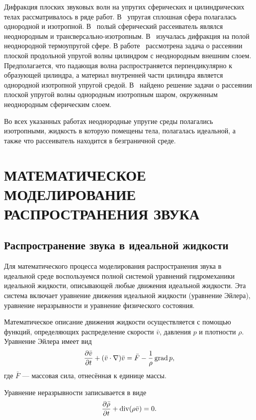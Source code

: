 Дифракция плоских звуковых волн на упругих сферических и цилиндрических телах рассматривалось в ряде работ. 
В~\cite{Faran} упругая сплошная сфера полагалась однородной и изотропной.
В~\cite{transversely isotropic spherical layer} полый сферический рассеиватель являлся неоднородным и трансверсально-изотропным. 
В~\cite{inhomogeneous thermo elastic spherical layer} изучалась дифракция на полой неоднородной термоупругой сфере.
В работе~\cite{plane elastic wave inhomogeneous cylinder} рассмотрена задача о рассеянии плоской продольной упругой волны цилиндром с неоднородным внешним слоем. Предполагается, что падающая волна распространяется перпендикулярно к образующей цилиндра, а материал внутренней части цилиндра является однородной изотропной упругой средой.
В~\cite{plane elastic wave inhomogeneous ball} найдено решение задачи о рассеянии плоской упругой волны однородным изотропным шаром, окруженным неоднородным сферическим слоем.


Во всех указанных работах неоднородные упругие среды полагались изотропными, жидкость в которую помещены тела, полагалась идеальной, а также что рассеиватель находится в безграничной среде.

\newpage
\section{МАТЕМАТИЧЕСКОЕ МОДЕЛИРОВАНИЕ РАСПРОСТРАНЕНИЯ ЗВУКА}
\subsection{Распространение звука в идеальной жидкости}

Для математического процесса моделирования распространения звука в идеальной среде воспользуемся полной системой уравнений гидромеханики идеальной жидкости, описывающей любые движения идеальной жидкости. Эта система включает уравнение движения идеальной жидкости (уравнение Эйлера), уравнение неразрывности и уравнение физического состояния.

Математическое описание движения жидкости осуществляется с помощью функций, определяющих распределение скорости $\bar{v}$, давления $p$ и плотности $\rho$. Уравнение Эйлера имеет вид
\begin{equation}\label{eq1}
\frac{\partial \bar{v}}{\partial t} + (\bar{v} \cdot \nabla)\bar{v} = \bar F - \frac{1}{\rho}\operatorname{grad} p,
\end{equation}
где $\bar F$ --- массовая сила, отнесённая к единице массы.

Уравнение неразрывности записывается в виде
\begin{equation}\label{eq2}
\frac{\partial \bar{\rho}}{\partial t} + \operatorname{div} (\rho \bar{v}) = 0.
\end{equation}

